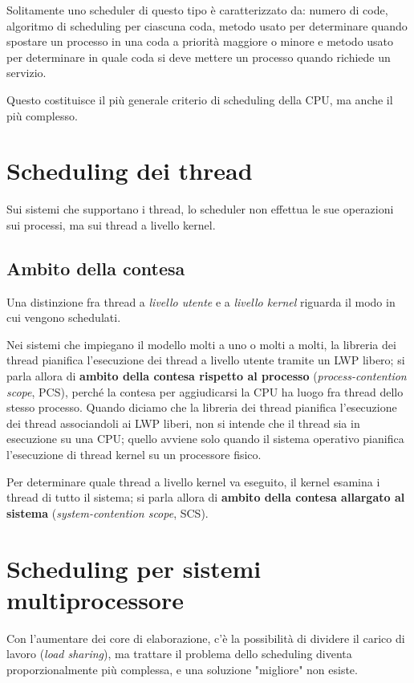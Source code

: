         Solitamente uno scheduler di questo tipo è caratterizzato da: numero di code, algoritmo di scheduling per ciascuna coda, metodo usato per determinare quando spostare un processo in una coda a priorità maggiore o minore e metodo usato per determinare in quale coda si deve mettere un processo quando richiede un servizio.
        
        Questo costituisce il più generale criterio di scheduling della CPU, ma anche il più complesso.
        
\section{Scheduling dei thread}
    Sui sistemi che supportano i thread, lo scheduler non effettua le sue operazioni sui processi, ma sui thread a livello kernel.
    
    \subsection{Ambito della contesa}
        Una distinzione fra thread a \textit{livello utente} e a \textit{livello kernel} riguarda il modo in cui vengono schedulati.
        
        Nei sistemi che impiegano il modello molti a uno o molti a molti, la libreria dei thread pianifica l'esecuzione dei thread a livello utente tramite un LWP libero; si parla allora di \textbf{ambito della contesa rispetto al processo} (\textit{process-contention scope}, PCS), perché la contesa per aggiudicarsi la CPU ha luogo fra thread dello stesso processo. Quando diciamo che la libreria dei thread pianifica l'esecuzione dei thread associandoli ai LWP liberi, non si intende che il thread sia in esecuzione su una CPU; quello avviene solo quando il sistema operativo pianifica l'esecuzione di thread kernel su un processore fisico.
        
        Per determinare quale thread a livello kernel va eseguito, il kernel esamina i thread di tutto il sistema; si parla allora di \textbf{ambito della contesa allargato al sistema} (\textit{system-contention scope}, SCS).
        
\section{Scheduling per sistemi multiprocessore}
    Con l'aumentare dei core di elaborazione, c'è la possibilità di dividere il carico di lavoro (\textit{load sharing}), ma trattare il problema dello scheduling diventa proporzionalmente più complessa, e una soluzione "migliore" non esiste.
    
